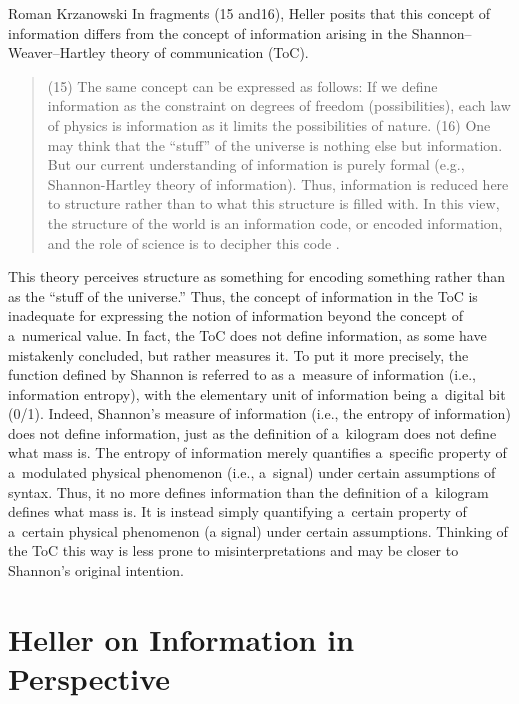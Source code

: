 \begin{artengenv}{Roman Krzanowski}
In fragments (15 and16), Heller posits that this concept of information differs from the concept of information arising in the Shannon–Weaver–Hartley theory of communication (ToC).



\begin{quote}
(15) The same concept can be expressed as follows: If we define information as the constraint on degrees of freedom (possibilities), each law of physics is information as it limits the possibilities of nature. (16) One may think that the ``stuff'' of the universe is nothing else but information. But our current understanding of information is purely formal (e.g., Shannon-Hartley theory of information). Thus, information is reduced here to structure rather than to what this structure is filled with. In this view, the structure of the world is an information code, or encoded information, and the role of science is to decipher this code 
\parencite[][]{heller_ewolucja_1987}.%
\end{quote}




This theory perceives structure as something for encoding something rather than as the ``stuff of the universe.'' Thus, the concept of information in the ToC is inadequate for expressing the notion of information beyond the concept of a~numerical value. In fact, the ToC does not define information, as some have mistakenly concluded, but rather measures it. To put it more precisely, the function defined by Shannon is referred to as a~measure of information (i.e., information entropy), with the elementary unit of information being a~digital bit (0/1). Indeed, Shannon's measure of information (i.e., the entropy of information) does not define information, just as the definition of a~kilogram does not define what mass is. The entropy of information merely quantifies a~specific property of a~modulated physical phenomenon (i.e., a~signal) under certain assumptions of syntax. Thus, it no more defines information than the definition of a~kilogram defines what mass is. It is instead simply quantifying a~certain property of a~certain physical phenomenon (a signal) under certain assumptions. Thinking of the ToC this way is less prone to misinterpretations and may be closer to Shannon's original intention.



\section{Heller on Information in Perspective}


\end{artengenv}

